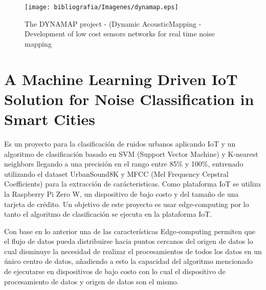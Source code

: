 \begin{figure}[H]
\centering
\texttt{[image: bibliografia/Imagenes/dynamap.eps]}
\caption{The DYNAMAP project - (Dynamic AcousticMapping - Development of low cost sensors networks for real time noise mapping\cite{Bellucci2018}}
\end{figure}

\section{A Machine Learning Driven IoT Solution for Noise Classification in Smart Cities}

Es un proyecto para la clasificación de ruidos urbanos aplicando IoT y un algoritmo de clasificación basado en SVM (Support Vector Machine) y K-nearest neighbors llegando a una precisión en el rango entre 85\% y 100\%, entrenado utilizando el dataset UrbanSound8K y MFCC (Mel Frequency Cepstral Coeﬃcients) para la extracción de carácteristicas. Como plataforma IoT se utiliza la Raspberry Pi Zero W, un dispositivo de bajo costo y del tamaño de una tarjeta de crédito. Un objetivo de este proyecto es usar edge-computing por lo tanto el algoritmo de clasificación se ejecuta en la plataforma IoT. 

Con base en lo anterior una de las características Edge-computing permiten que el flujo de datos pueda distribuirse hacia puntos cercanos del origen de datos lo cual disminuye la necesidad de realizar el procesamientos de todos los datos en un único centro de datos, añadiendo a esto la capacidad del algoritmo mencionado de ejecutarse en dispositivos de bajo costo con lo cual el dispositivo de procesamiento de datos y origen de datos son el mismo. 